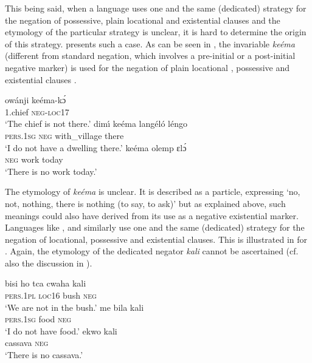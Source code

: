 \documentclass[output=paper,draft,draftmode,colorlinks,citecolor=brown]{langscibook}
\begin{document}
This being said, when a language uses one and the same (dedicated) strategy
for the negation of possessive, plain locational and existential clauses
and the etymology of the particular strategy is unclear, it is hard to
determine the origin of this strategy.  presents such a
case. As can be seen in , the invariable \textit{ke{é}ma} (different from standard
negation, which involves a pre-initial or a post-initial negative marker) is
used for the negation of plain locational , possessive
 and existential clauses .

\ea\label{ex:tetela-chief-dwelling-work}

\ea\label{ex:tetela-chief}
\gll owánji ke{é}ma-k{\'ɔ}\\ 1.chief
\textsc{neg-loc}17\\ 
\glt 	`The chief is not there.'
%
\ex\label{ex:tetela-dwelling} 
\gll dim{\'\i} ke{é}ma lang{é}l{\'o} l{é}ngo\\
\textsc{pers.1sg} \textsc{neg} with\_village there\\
\glt 	`I
do not have a dwelling there.'
\ex\label{ex:tetela-work}
\gll ke{é}ma
olemp ɛl{\'ɔ}\\ \textsc{neg} work today\\
\glt 	`There is no work today.'
\z
\z

The etymology of \textit{ke{é}ma} is unclear. It is described as a particle, expressing `no, not, nothing, there is nothing (to say, to
ask)' \citep[155]{Hagendorens1957} but as explained above, such meanings
could also have derived from its use as a negative existential marker.
Languages like ,  and  similarly use one
and the same (dedicated) strategy for the negation of locational,
possessive and existential clauses. This is illustrated in
 for . Again, the etymology of
the dedicated negator \textit{kali} cannot be ascertained (cf. also the
discussion in ).
%

\ea\label{ex:mbete-bush-food-cassava} 

\ea\gll bisi ho {tca cwaha} kali\\ \textsc{pers.1pl}
\textsc{loc}16 bush \textsc{neg}\\ 
\glt `We are not in the bush.'
\ex\gll me bila kali\\ 
\textsc{pers.1sg} food \textsc{neg}\\ 
\glt 	`I do not have food.' 
\ex\gll ekwo kali\\ cassava \textsc{neg}\\ 
\glt `There is no cassava.'
\z
\z
\end{document}
